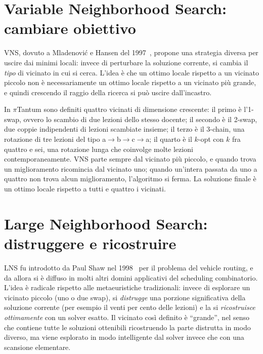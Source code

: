 \section{Variable Neighborhood Search: cambiare obiettivo}

VNS, dovuto a Mladenovi\'c e Hansen del
1997~\parencite{mladenovic1997}, propone una strategia
diversa per uscire dai minimi locali: invece di perturbare
la soluzione corrente, si cambia il \emph{tipo} di vicinato
in cui si cerca. L'idea \`e che un ottimo locale rispetto a
un vicinato piccolo non \`e necessariamente un ottimo
locale rispetto a un vicinato pi\`u grande, e quindi
crescendo il raggio della ricerca si pu\`o uscire
dall'incastro.

In $\pi$Tantum sono definiti quattro vicinati di dimensione
crescente: il primo \`e l'1-swap, ovvero lo scambio di due
lezioni dello stesso docente; il secondo \`e il 2-swap, due
coppie indipendenti di lezioni scambiate insieme; il terzo
\`e il 3-chain, una rotazione di tre lezioni del tipo a$\to$b$\to$c$\to$a;
il quarto \`e il $k$-opt con $k$ fra quattro e sei, una
rotazione lunga che coinvolge molte lezioni
contemporaneamente. VNS parte sempre dal vicinato pi\`u
piccolo, e quando trova un miglioramento ricomincia dal
vicinato uno; quando un'intera passata da uno a quattro non
trova alcun miglioramento, l'algoritmo si ferma. La
soluzione finale \`e un ottimo locale rispetto a tutti e
quattro i vicinati.

\section{Large Neighborhood Search: distruggere e ricostruire}

LNS fu introdotto da Paul Shaw nel
1998~\parencite{shaw1998} per il problema del vehicle
routing, e da allora si \`e diffuso in molti altri domini
applicativi del scheduling combinatorio. L'idea \`e radicale
rispetto alle metaeuristiche tradizionali: invece di
esplorare un vicinato piccolo (uno o due swap), si
\emph{distrugge} una porzione significativa della soluzione
corrente (per esempio il venti per cento delle lezioni) e la
si \emph{ricostruisce ottimamente} con un solver esatto. Il
vicinato cos\`i definito \`e ``grande'', nel senso che
contiene tutte le soluzioni ottenibili ricostruendo la parte
distrutta in modo diverso, ma viene esplorato in modo
intelligente dal solver invece che con una scansione
elementare.

